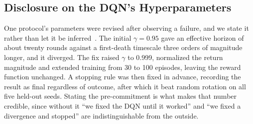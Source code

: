\subsection{Disclosure on the DQN's Hyperparameters}
\label{sec:dqn-disclosure}

One protocol's parameters were revised after observing a failure, and we state
it rather than let it be inferred~\cite{henderson2018matters}. The initial
$\gamma = 0.95$ gave an effective horizon of about twenty rounds against a
first-death timescale three orders of magnitude longer, and it diverged. The fix
raised $\gamma$ to 0.999, normalized the return magnitude and extended training
from 30 to 100 episodes, leaving the reward function unchanged. A stopping rule
was then fixed in advance, recording the result as final regardless of outcome,
after which it beat random rotation on all five held-out seeds. Stating the
pre-commitment is what makes that number credible, since without it ``we fixed
the DQN until it worked'' and ``we fixed a divergence and stopped'' are
indistinguishable from the outside.
